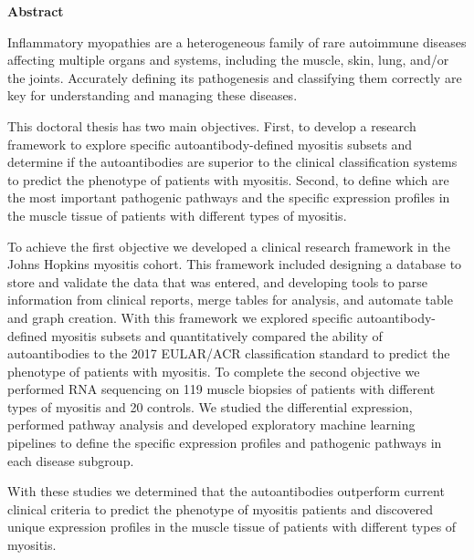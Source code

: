 \cleardoublepage
\thispagestyle{empty}

\begin{center}
    \Large
    \textbf{\thetitle}
    
    \vspace{0.2cm}
    \large
    \textbf{\theauthor}
    
    \vspace{0.2cm}
    \textbf{Abstract}
\end{center}

Inflammatory myopathies are a heterogeneous family of rare autoimmune diseases affecting multiple organs and systems, including the muscle, skin, lung, and/or the joints.  Accurately defining its pathogenesis and classifying them correctly are key for understanding and managing these diseases.

This doctoral thesis has two main objectives. First, to develop a research framework to explore specific autoantibody-defined myositis subsets and determine if the autoantibodies are superior to the clinical classification systems to predict the phenotype of patients with myositis. Second, to define which are the most important pathogenic pathways and the specific expression profiles in the muscle tissue of patients with different types of myositis.

To achieve the first objective we developed a clinical research framework in the Johns Hopkins myositis cohort. This framework included designing a database to store and validate the data that was entered, and developing tools to parse information from clinical reports, merge tables for analysis, and automate table and graph creation. With this framework we explored specific autoantibody-defined myositis subsets and quantitatively compared the ability of autoantibodies to the 2017 EULAR/ACR classification standard to predict the phenotype of patients with myositis. To complete the second objective we performed RNA sequencing on 119 muscle biopsies of patients with different types of myositis and 20 controls. We studied the differential expression, performed pathway analysis and developed exploratory machine learning pipelines to define the specific expression profiles and pathogenic pathways in each disease subgroup. 

With these studies we determined that the autoantibodies outperform current clinical criteria to predict the phenotype of myositis patients and discovered unique expression profiles in the muscle tissue of patients with different types of myositis.
